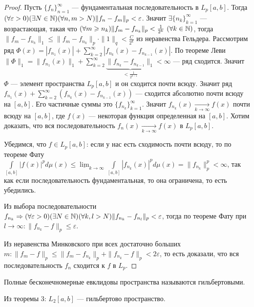 \begin{proof}
	Пусть $\{f_n\}_{n=1}^\infty$ --- фундаментальная последовательность в $L_p[a,b]$. Тогда $(\forall\varepsilon >0)(\exists N\in \mathbb{N})(\forall n,m>N) \|f_n-f_m\|_p<\varepsilon$. Значит $\exists\{n_k\}_{k=1}^\infty$ --- возрастающая, такая что $(\forall m\geqslant n_k) \|f_m-f_{n_k}\|_p<\frac{1}{2^k}\ (\forall k\in \mathbb{N})$, тогда  $\|f_m-f_{n_k}\|_1\leqslant\|f_m-f_{n_k}\|_p\cdot\|1\|_q<\frac{C}{2^k}$ из неравенства Гельдера. Рассмотрим ряд $\Phi(x)=|f_{n_1}(x)|+\sum\limits_{k=2}^\infty |f_{n_k}(x)-f_{n_{k-1}}(x)|$. По теореме Леви $\|\Phi\|_1= \|f_{n_1}(x)\|_1+\sum\limits_{k=2}^\infty \underbrace{\|f_{n_k}-f_{n_{k-1}}\|_1}_{<\frac{1}{2^{k-1}}}<\infty$ --- ряд сходится. Значит $\Phi$ --- элемент пространства $L_p[a,b]$ и он сходится почти всюду. Значит ряд $f_{n_1}(x)+\sum\limits_{k=2}^\infty (f_{n_k}(x)-f_{n_{k-1}}(x))$ --- сходится абсолютно почти всюду на $[a,b]$. Его частичные суммы это $\{f_{n_k}\}_{k=1}^\infty$. Значит $f_{n_k}(x)\underset{k\to\infty}{\to}f(x)$ почти всюду на $[a,b]$, где $f(x)$ --- некоторая функция определенная на $[a,b]$. Хотим доказать, что вся последовательность $f_n(x)\underset{k\to\infty}{\to}f(x)$ в $L_p[a,b]$.
	
	Убедимся, что $f\in L_p[a,b]$: если у нас есть сходимость почти всюду, то по теореме Фату $\int\limits_{[a,b]}|f(x)|^pd\mu(x)\leqslant\underline{\lim}_{k\to\infty}\int\limits_{[a,b]}|f_{n_k}(x)|^pd\mu(x)=\|f_{n_k}\|^p_p<\infty$, так как если последовательность фундаментальная, то она ограничена, то есть убедились.
	
	Из выбора последовательности $f_{n_k}\Rightarrow(\forall\varepsilon>0)(\exists N\in\mathbb{N})(\forall k,l>N) \|f_{n_k}-f_{n_l}\|_p<\varepsilon$, тогда по теореме Фату при $l\to\infty: \|f_{n_k}-f\|_p\leqslant\varepsilon$.
	
	Из неравенства Минковского при всех достаточно больших $m:\|f_m-f\|_p\leqslant \|f_m-f_{n_k}\|_p+\|f_{n_k}-f\|_p<2\varepsilon$, то есть доказали, что вся последовательность $f_n$ сходится к $f$ в $L_p$.
\end{proof}

\begin{Def}
	Полные бесконечномерные евклидовы пространства называются гильбертовыми.
\end{Def}

\begin{corollary}
	Из теоремы 3: $L_2[a,b]$ --- гильбертово пространство.
\end{corollary}

